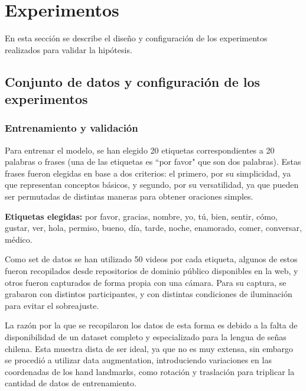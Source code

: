 \documentclass[10pt]{article}
\begin{document}
\section{Experimentos}

\vspace{1\baselineskip}
En esta sección se describe el diseño y configuración de los experimentos realizados para validar la hipótesis.

\subsection{Conjunto de datos y configuración de los experimentos}

\subsubsection{Entrenamiento y validación}

\vspace{1\baselineskip}
Para entrenar el modelo, se han elegido 20 etiquetas correspondientes a 20 palabras o frases (una de las etiquetas es ``por favor" que son dos palabras). Estas frases fueron elegidas en base a dos criterios: el primero, por su simplicidad, ya que representan conceptos básicos, y segundo, por su versatilidad, ya que pueden ser permutadas de distintas maneras para obtener oraciones simples.

\vspace{1\baselineskip}
\textbf{Etiquetas elegidas: }por favor, gracias, nombre, yo, tú, bien, sentir, cómo, gustar, ver, hola, permiso, bueno, día, tarde, noche, enamorado, comer, conversar, médico.

\vspace{1\baselineskip}
Como set de datos se han utilizado 50 videos por cada etiqueta, algunos de estos fueron recopilados desde repositorios de dominio público disponibles en la web, y otros fueron capturados de forma propia con una cámara. Para su captura, se grabaron con distintos participantes, y con distintas condiciones de iluminación para evitar el sobreajuste. 

La razón por la que se recopilaron los datos de esta forma es debido a la falta de disponibilidad de un dataset completo y especializado para la lengua de señas chilena.  Esta muestra dista de ser ideal, ya que no es muy extensa, sin embargo se procedió a utilizar data augmentation, introduciendo variaciones en las coordenadas de los hand landmarks, como rotación y traslación para triplicar la cantidad de datos de entrenamiento.
\end{document}
